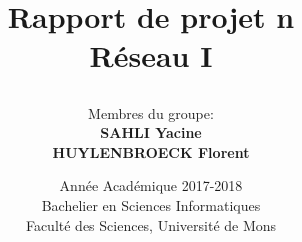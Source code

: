 \documentclass[]{article}
\begin{document}
\title{
{\Huge Rapport de projet n}\\
Réseau I\\
\author{Membres du groupe:\\
\textbf{SAHLI Yacine}\\
\textbf{HUYLENBROECK Florent}\\
}}

\date{Année Académique 2017-2018\\
Bachelier en Sciences Informatiques\\
\vspace{1cm}
Faculté des Sciences, Université de Mons}

\maketitle
\newpage
\end{document}
